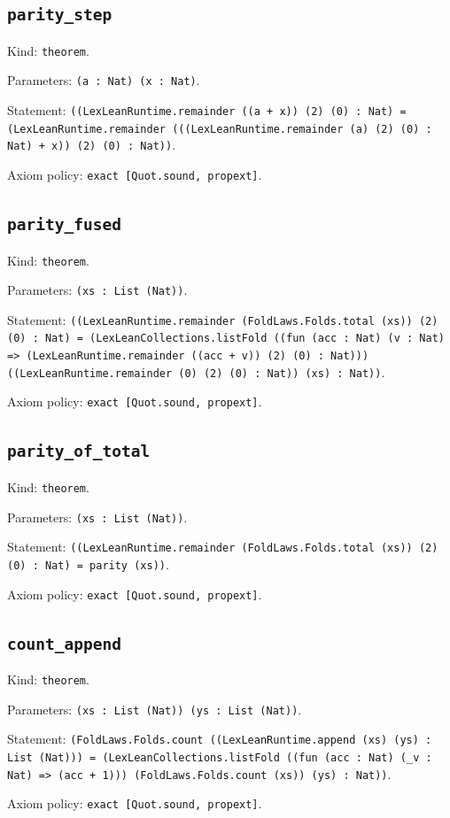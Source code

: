 \documentclass[11pt]{article}
\begin{document}
\subsection*{\texttt{parity\_step}}
\noindent Kind: \texttt{theorem}.\par
\noindent Parameters: \texttt{(a : Nat) (x : Nat)}.\par
\noindent Statement: \texttt{((LexLeanRuntime.remainder ((a + x)) (2) (0) : Nat) = (LexLeanRuntime.remainder (((LexLeanRuntime.remainder (a) (2) (0) : Nat) + x)) (2) (0) : Nat))}.\par
\noindent Axiom policy: \texttt{exact [Quot.sound, propext]}.\par
\subsection*{\texttt{parity\_fused}}
\noindent Kind: \texttt{theorem}.\par
\noindent Parameters: \texttt{(xs : List (Nat))}.\par
\noindent Statement: \texttt{((LexLeanRuntime.remainder (FoldLaws.Folds.total (xs)) (2) (0) : Nat) = (LexLeanCollections.listFold ((fun (acc : Nat) (v : Nat) => (LexLeanRuntime.remainder ((acc + v)) (2) (0) : Nat))) ((LexLeanRuntime.remainder (0) (2) (0) : Nat)) (xs) : Nat))}.\par
\noindent Axiom policy: \texttt{exact [Quot.sound, propext]}.\par
\subsection*{\texttt{parity\_of\_total}}
\noindent Kind: \texttt{theorem}.\par
\noindent Parameters: \texttt{(xs : List (Nat))}.\par
\noindent Statement: \texttt{((LexLeanRuntime.remainder (FoldLaws.Folds.total (xs)) (2) (0) : Nat) = parity (xs))}.\par
\noindent Axiom policy: \texttt{exact [Quot.sound, propext]}.\par
\subsection*{\texttt{count\_append}}
\noindent Kind: \texttt{theorem}.\par
\noindent Parameters: \texttt{(xs : List (Nat)) (ys : List (Nat))}.\par
\noindent Statement: \texttt{(FoldLaws.Folds.count ((LexLeanRuntime.append (xs) (ys) : List (Nat))) = (LexLeanCollections.listFold ((fun (acc : Nat) (\_v : Nat) => (acc + 1))) (FoldLaws.Folds.count (xs)) (ys) : Nat))}.\par
\noindent Axiom policy: \texttt{exact [Quot.sound, propext]}.\par
\end{document}
